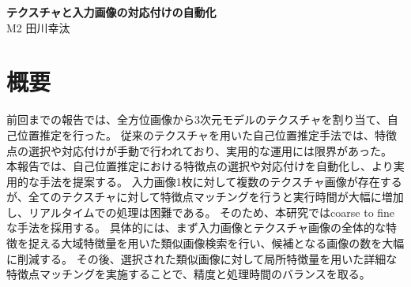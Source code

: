 \documentclass[]{jarticle}          %
\begin{document}

\vspace*{2ex}
\begin{center}
 {\Large \bf テクスチャと入力画像の対応付けの自動化}\\ %
 \vspace*{5mm}
 {\large M2 田川幸汰}%
\end{center}






\section{概要}
前回までの報告では、全方位画像から3次元モデルのテクスチャを割り当て、自己位置推定を行った。
従来のテクスチャを用いた自己位置推定手法では、特徴点の選択や対応付けが手動で行われており、実用的な運用には限界があった。
本報告では、自己位置推定における特徴点の選択や対応付けを自動化し、より実用的な手法を提案する。
入力画像1枚に対して複数のテクスチャ画像が存在するが、全てのテクスチャに対して特徴点マッチングを行うと実行時間が大幅に増加し、リアルタイムでの処理は困難である。
そのため、本研究ではcoarse to fineな手法を採用する。
具体的には、まず入力画像とテクスチャ画像の全体的な特徴を捉える大域特徴量を用いた類似画像検索を行い、候補となる画像の数を大幅に削減する。
その後、選択された類似画像に対して局所特徴量を用いた詳細な特徴点マッチングを実施することで、精度と処理時間のバランスを取る。
\end{document}
